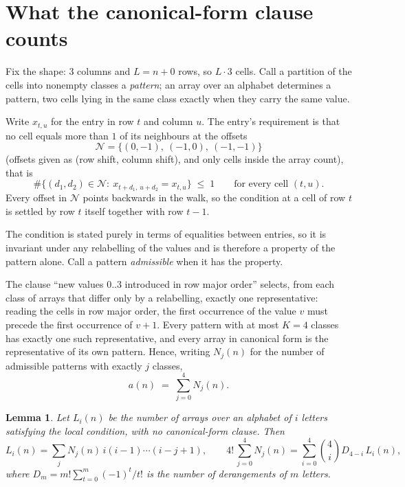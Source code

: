 \documentclass[11pt,a4paper]{article}
\theoremstyle{plain}
\newtheorem{lemma}[theorem]{Lemma}
\theoremstyle{definition}
\begin{document}
\section{What the canonical-form clause counts}

Fix the shape: $3$ columns and $L=n+0$ rows, so $L\cdot3$ cells. Call a
partition of the cells into nonempty classes a \emph{pattern}; an array over an alphabet
determines a pattern, two cells lying in the same class exactly when they carry the same
value.

Write $x_{t,u}$ for the entry in row $t$ and column $u$. The
entry's requirement is that no cell equals more than $1$ of its neighbours at the
offsets
\[
\mathcal N=\{(0,-1),\ (-1,0),\ (-1,-1)\}
\]
(offsets given as (row shift, column shift), and only cells inside the array count),
that is
\begin{equation}\label{eq:loc}
\#\bigl\{(d_1,d_2)\in\mathcal N:\ x_{t+d_1,\,u+d_2}=x_{t,u}\bigr\}\;\le\;1
\qquad\text{for every cell }(t,u).
\end{equation}
Every offset in $\mathcal N$ points backwards in the walk, so the condition at a cell of
row $t$ is settled by row $t$ itself together with row $t-1$.

The condition is stated purely in terms of equalities between entries, so it is invariant
under any relabelling of the values and is therefore a property of the pattern alone. Call a
pattern \emph{admissible} when it has the property.

The clause ``new values $0..3$ introduced in row major order'' selects, from each class
of arrays that differ only by a relabelling, exactly one representative: reading the cells in
row major order, the first occurrence of the value $v$ must precede the first occurrence of
$v+1$. Every pattern with at most $K=4$ classes has exactly one such representative, and
every array in canonical form is the representative of its own pattern. Hence, writing
$N_j(n)$ for the number of admissible patterns with exactly $j$ classes,
\begin{equation}\label{eq:apat}
a(n)\;=\;\sum_{j=0}^{4}N_j(n).
\end{equation}

\begin{lemma}\label{lem:inv}
Let $L_i(n)$ be the number of arrays over an alphabet of $i$ letters satisfying the local
condition, with no canonical-form clause. Then
\[
L_i(n)=\sum_j N_j(n)\,i(i-1)\cdots(i-j+1),
\qquad
4!\,\sum_{j=0}^{4}N_j(n)=\sum_{i=0}^{4}\binom{4}{i}D_{4-i}\,L_i(n),
\]
where $D_m=m!\sum_{t=0}^{m}(-1)^t/t!$ is the number of derangements of $m$ letters.
\end{lemma}
\end{document}
